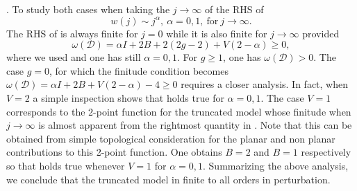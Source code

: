 \documentclass[10pt]{book}
\theoremstyle{break}
\begin{document}
. To study both cases when taking the $j\to\infty$ of the RHS of %
\begin{equation*}
w(j)\sim j^\alpha,\ \alpha=0,1,\ {\text{for}}\  j\to\infty.%
\end{equation*}
The RHS of %
is always finite for $j=0$ while it is also finite for $j\to\infty$ provided%
\begin{equation*}
\omega(\mathcal{D})=\alpha I+2B+2(2g-2)+V(2-\alpha)\ge0,%
\end{equation*}
where we used %
and one has still $\alpha=0,1$. For $g\ge1$, one has $\omega(\mathcal{D})>0$. The case $g=0$, for which the finitude condition %
becomes $\omega(\mathcal{D})=\alpha I+2B+V(2-\alpha)-4\ge0$ requires a closer analysis. In fact, when $V=2$ a simple inspection shows that %
holds true for $\alpha=0,1$. The case $V=1$ corresponds to the 2-point function for the truncated model whose finitude when $j\to\infty$ is almost apparent from the rightmost quantity in %
. Note that this can be obtained from simple topological consideration for the planar and non planar contributions to this 2-point function. One obtains $B=2$ and $B=1$ respectively so that %
holds true whenever $V=1$ for $\alpha=0,1$. Summarizing the above analysis, we conclude that the truncated model in finite to all orders in perturbation.\par
\end{document}
